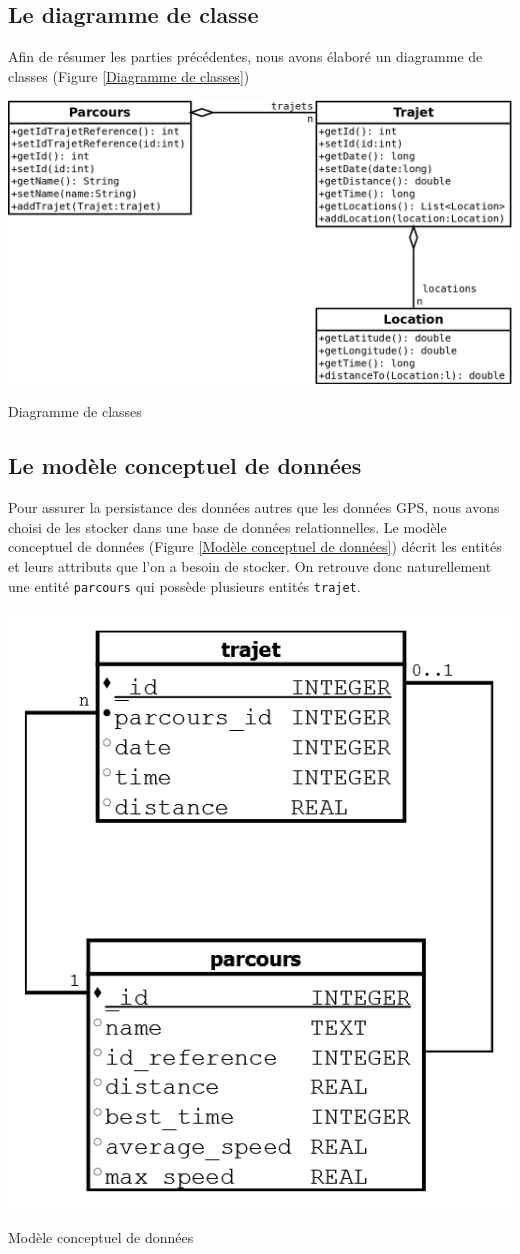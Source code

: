 \subsection{Le diagramme de classe}
Afin de résumer les parties précédentes, nous avons élaboré un diagramme de classes (Figure \ref{Diagramme de classes})
\begin{img}
  \includegraphics[scale=0.4]{img/DiagrammeDeClasse.png}
  \caption{Diagramme de classes}
  \label{Diagramme de classes}
\end{img}

\subsection{Le modèle conceptuel de données}
Pour assurer la persistance des données autres que les données GPS, nous avons choisi de les stocker dans une base de données relationnelles. Le modèle conceptuel de données (Figure \ref{Modèle conceptuel de données}) décrit les entités et leurs attributs que l'on a besoin de stocker. On retrouve donc naturellement une entité \verb!parcours! qui possède plusieurs entités \verb!trajet!. 

\begin{img}
  \includegraphics[scale=0.25]{img/bdd.png}
  \caption{Modèle conceptuel de données}
  \label{Modèle conceptuel de données}
\end{img}
